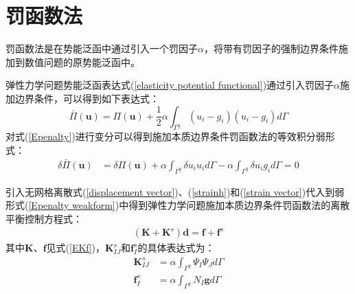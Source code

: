 \section{罚函数法}
罚函数法\cite{}是在势能泛函中通过引入一个罚因子$\alpha$，将带有罚因子的强制边界条件施加到数值问题的原势能泛函中。\par
弹性力学问题势能泛函表达式(\ref{elasticity potential functional})通过引入罚因子$\alpha$施加边界条件，可以得到如下表达式：
\begin{equation}\label{Epenalty}
    \bar{\Pi}(\pmb{u})=\Pi(\pmb{u})+\frac{1}{2}\alpha\int_{\Gamma^g}(u_i-g_i)(u_i-g_i)d\Gamma
\end{equation}
对式(\ref{Epenalty})进行变分可以得到施加本质边界条件罚函数法的等效积分弱形式：
\begin{equation}\label{Epenalty weakform}
\begin{split}
    \delta\bar{\Pi}(\pmb{u})&=\delta\Pi(\pmb{u})+\alpha\int_{\Gamma^g}\delta u_iu_id\Gamma-\alpha\int_{\Gamma^g}\delta u_ig_id\Gamma
    =0
\end{split}                                                 
\end{equation}\par
引入无网格离散式(\ref{displacement vector})、(\ref{strainh})和(\ref{strain vector})代入到弱形式(\ref{Epenalty weakform})中得到弹性力学问题施加本质边界条件罚函数法的离散平衡控制方程式：
\begin{equation}
\begin{split}
    (\pmb{K}+\pmb{K}^s)\pmb{d}=\pmb{f}+\pmb{f}^s
\end{split}
\end{equation}
其中$\pmb{K}$、$\pmb{f}$见式(\ref{EKf})，$\pmb K^s_{I\!J}$和$\pmb f^s_I$的具体表达式为：
\begin{subequations}
\begin{align}
  \pmb K^s_{I\!J}&=\alpha\int_{\Gamma^g}\Psi_I\Psi_Jd\Gamma\\
  \pmb f^s_I&=\alpha\int_{\Gamma^g}N_I\pmb{g}d\Gamma
\end{align}
\end{subequations}\par
